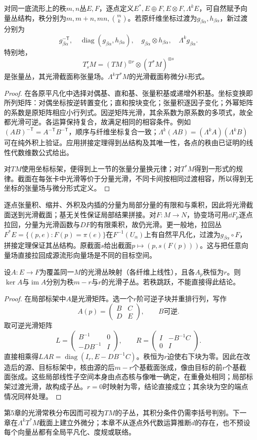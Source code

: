 \begin{theorem}[丛的代数运算与张量场]\label{thm:tensor-bundles}
对同一底流形上的秩$m,n$丛$E,F$，逐点定义$E^*,E\oplus F,E\otimes F,\Lambda^kE$，可自然赋予向量丛结构，秩分别为$m,m+n,mn,\binom mk$。若原纤维坐标过渡为$g_{\beta\alpha},h_{\beta\alpha}$，新过渡分别为
\[
 g_{\beta\alpha}^{-\mathsf T},\quad
 \operatorname{diag}(g_{\beta\alpha},h_{\beta\alpha}),\quad
 g_{\beta\alpha}\otimes h_{\beta\alpha},\quad
 \Lambda^k g_{\beta\alpha}.
\]
特别地，
\[
 T^r_sM=(TM)^{\otimes r}\otimes(T^*M)^{\otimes s}
\]
是张量丛，其光滑截面称张量场。$\Lambda^kT^*M$的光滑截面称微分$k$形式。
\end{theorem}
\begin{proof}
在各原平凡化中选择对偶基、直和基、张量积基或递增外积基。坐标变换即所列矩阵：对偶坐标按逆转置变化；直和按块变化；张量积逐因子变化；外幂矩阵的系数是原矩阵相应小行列式。因逆矩阵光滑，其余系数为原系数的多项式，故全都光滑可逆。各运算保持复合，故满足相同的相容条件。例如$(AB)^{-\mathsf T}=A^{-\mathsf T}B^{-\mathsf T}$，顺序与纤维坐标复合一致；$\Lambda^k(AB)=(\Lambda^kA)(\Lambda^kB)$可在纯外积上验证。应用拼接定理得到丛结构及其唯一性，各点的秩由已证明的线性代数维数公式给出。

对$TM$使用坐标标架，便得到上一节的张量分量换元律；对$T^*M$得到一形式的规律。截面在每张卡中光滑等价于分量光滑，不同卡间按相同过渡相容，所以得到无坐标的张量场与微分形式定义。
\end{proof}
逐点张量积、缩并、外积及内插的分量为局部分量的有限和与乘积，因此将光滑截面送到光滑截面；基无关性保证局部结果拼接。对$F:M\to N$，协变场可用$\dd F_p$逐点拉回，分量为光滑函数与$DF$的有限乘积，故仍光滑。更一般地，拉回丛$F^*E=\{(p,e):F(p)=\pi(e)\}$在$F^{-1}(U_\alpha)$上有自然平凡化，过渡为$g_{\beta\alpha}\circ F$，拼接定理保证其丛结构。原截面$s$给出截面$p\mapsto(p,s(F(p)))$。这与把任意向量场直接拉回成源流形向量场是不同的目标空间。
\begin{proposition}[常秩丛映射的核与像]\label{prop:bundle-constant-rank}
设$A:E\to F$为覆盖同一$M$的光滑丛映射（各纤维上线性），且各$A_p$秩恒为$r$。则$\ker A$与$\operatorname{im}A$分别为秩$m-r$与$r$的光滑子丛。若秩跳跃，不能直接得此结论。
\end{proposition}
\begin{proof}
在局部标架中$A$是光滑矩阵。选一个$r$阶可逆子块并重排行列，写作
\[
 A(p)=\begin{pmatrix}B&C\\D&E\end{pmatrix},\qquad B\text{可逆}.
\]
取可逆光滑矩阵
\[
 L=\begin{pmatrix}B^{-1}&0\\-DB^{-1}&I\end{pmatrix},\qquad
 R=\begin{pmatrix}I&-B^{-1}C\\0&I\end{pmatrix}.
\]
直接相乘得$LAR=\operatorname{diag}(I_r,E-DB^{-1}C)$。秩恒为$r$迫使右下块为零。因此在改造后的源、目标标架中，核由源的后$m-r$个基截面张成，像由目标的前$r$个基截面张成。这些局部线性子空间本身由点态核与像唯一确定，在重叠处相同；局部标架过渡光滑，故构成子丛。$r=0$时映射为零，结论直接成立；其余块为空的端点情况同样处理。
\end{proof}
第5章的光滑常秩分布因而可视为$TM$的子丛，其积分条件仍需李括号判别。下一章在$\Lambda^kT^*M$截面上建立外微分；本章不从逐点外代数运算推断$d$的存在，也不预设每个向量丛都有全局平凡化、度规或联络。
